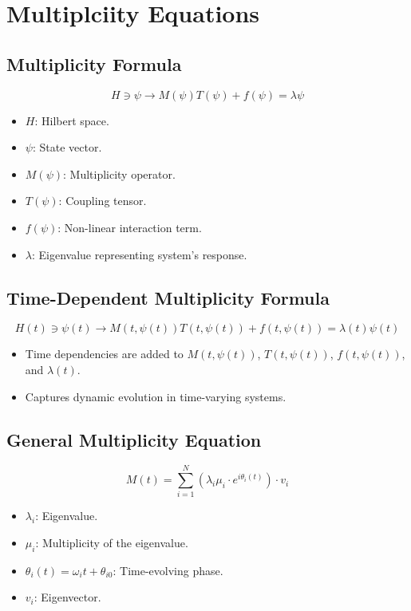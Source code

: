 \documentclass{article}
\theoremstyle{plain}
\begin{document}
\section{Multiplciity Equations}
\subsection{Multiplicity Formula}
\begin{equation}
H \ni \psi \to M(\psi)T(\psi) + f(\psi) = \lambda \psi
\end{equation}
\begin{itemize}
    \item \( H \): Hilbert space.
    \item \( \psi \): State vector.
    \item \( M(\psi) \): Multiplicity operator.
    \item \( T(\psi) \): Coupling tensor.
    \item \( f(\psi) \): Non-linear interaction term.
    \item \( \lambda \): Eigenvalue representing system's response.
\end{itemize}

\subsection{Time-Dependent Multiplicity Formula}
\begin{equation}
H(t) \ni \psi(t) \to M(t, \psi(t))T(t, \psi(t)) + f(t, \psi(t)) = \lambda(t)\psi(t)
\end{equation}
\begin{itemize}
    \item Time dependencies are added to \( M(t, \psi(t)) \), \( T(t, \psi(t)) \), \( f(t, \psi(t)) \), and \( \lambda(t) \).
    \item Captures dynamic evolution in time-varying systems.
\end{itemize}

\subsection{General Multiplicity Equation}
\begin{equation}
M(t) = \sum_{i=1}^N \left( \lambda_i \mu_i \cdot e^{i\theta_i(t)} \right) \cdot v_i
\end{equation}
\begin{itemize}
    \item \( \lambda_i \): Eigenvalue.
    \item \( \mu_i \): Multiplicity of the eigenvalue.
    \item \( \theta_i(t) = \omega_i t + \theta_{i0} \): Time-evolving phase.
    \item \( v_i \): Eigenvector.
\end{itemize}
\end{document}
